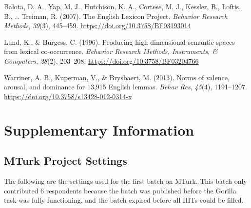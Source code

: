 \documentclass[man]{apa6}
\begin{document}
\leavevmode\hypertarget{ref-balota_english_2007}{}%
Balota, D. A., Yap, M. J., Hutchison, K. A., Cortese, M. J., Kessler, B., Loftis, B., \ldots{} Treiman, R. (2007). The English Lexicon Project. \emph{Behavior Research Methods}, \emph{39}(3), 445--459. \url{https://doi.org/10.3758/BF03193014}

\leavevmode\hypertarget{ref-lund_producing_1996}{}%
Lund, K., \& Burgess, C. (1996). Producing high-dimensional semantic spaces from lexical co-occurrence. \emph{Behavior Research Methods, Instruments, \& Computers}, \emph{28}(2), 203--208. \url{https://doi.org/10.3758/BF03204766}

\leavevmode\hypertarget{ref-warriner_norms_2013}{}%
Warriner, A. B., Kuperman, V., \& Brysbaert, M. (2013). Norms of valence, arousal, and dominance for 13,915 English lemmas. \emph{Behav Res}, \emph{45}(4), 1191--1207. \url{https://doi.org/10.3758/s13428-012-0314-x}

\endgroup

\newpage

\hypertarget{supplementary-information}{%
\section{Supplementary Information}\label{supplementary-information}}

\hypertarget{mturk-project-settings}{%
\subsection{MTurk Project Settings}\label{mturk-project-settings}}

The following are the settings used for the first batch on MTurk. This batch only contributed 6 respondents because the batch was published before the Gorilla task was fully functioning, and the batch expired before all HITs could be filled.
\end{document}
